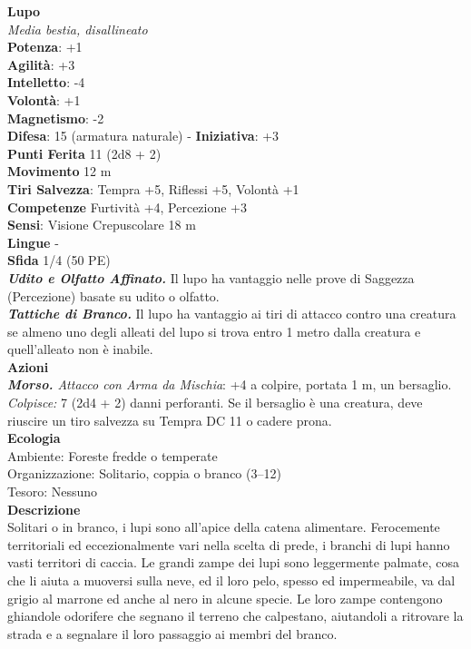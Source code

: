 \begin{multicols}{2}
\medskip\textbf{Lupo}\\
\emph{Media bestia, disallineato}\\
\textbf{Potenza}: +1\\
\textbf{Agilità}: +3\\
\textbf{Intelletto}: -4\\
\textbf{Volontà}: +1\\
\textbf{Magnetismo}: -2\\
\textbf{Difesa}: 15 (armatura naturale) - \textbf{Iniziativa}: +3\\
\textbf{Punti Ferita} 11 (2d8 + 2)\\
\textbf{Movimento} 12 m\\
\textbf{Tiri Salvezza}: Tempra +5, Riflessi +5, Volontà +1 \\
\textbf{Competenze} Furtività +4, Percezione +3\\
\textbf{Sensi}: Visione Crepuscolare 18 m\\
\textbf{Lingue} -\\
\textbf{Sfida} 1/4 (50 PE)\smallskip\\
\emph{\textbf{Udito e Olfatto Affinato.}} Il lupo ha vantaggio nelle prove di Saggezza (Percezione) basate su udito o olfatto.\\
\emph{\textbf{Tattiche di Branco.}} Il lupo ha vantaggio ai tiri di attacco contro una creatura se almeno uno degli alleati del lupo si trova entro 1 metro dalla creatura e quell'alleato non è inabile.\\
\smallskip\textbf{Azioni}\\
\emph{\textbf{Morso.} Attacco con Arma da Mischia}: +4 a colpire, portata 1 m, un bersaglio.\\

\emph{Colpisce:} 7 (2d4 + 2) danni perforanti. Se il bersaglio è una creatura, deve riuscire un tiro salvezza su Tempra DC 11 o cadere prona.\\
\textbf{Ecologia}\\
Ambiente: Foreste fredde o temperate\\
Organizzazione: Solitario, coppia o branco (3–12)\\
Tesoro: Nessuno\\
\textbf{Descrizione}\\

Solitari o in branco, i lupi sono all’apice della catena alimentare. Ferocemente territoriali ed eccezionalmente vari nella scelta di prede, i branchi di lupi hanno vasti territori di caccia. Le grandi zampe dei lupi sono leggermente palmate, cosa che li aiuta a muoversi sulla neve, ed il loro pelo, spesso ed impermeabile, va dal grigio al marrone ed anche al nero in alcune specie. Le loro zampe contengono ghiandole odorifere che segnano il terreno che calpestano, aiutandoli a ritrovare la strada e a segnalare il loro passaggio ai membri del branco.\\


\end{multicols}
